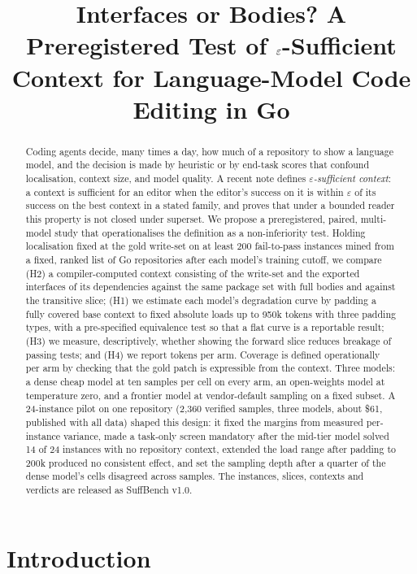 \documentclass[10pt,conference]{IEEEtran}
\title{Interfaces or Bodies? A Preregistered Test of $\eps$-Sufficient Context for Language-Model Code Editing in Go}
\author{\IEEEauthorblockN{Jude Castiel Johansen}
\IEEEauthorblockA{Shockware Limited, independent researcher\\ castiel@shockware.co.uk \quad ORCID 0009-0002-5644-3073}}
\newcommand{\eps}{\varepsilon}
\begin{document}
\maketitle

\begin{abstract}
Coding agents decide, many times a day, how much of a repository to show a language model, and the decision is made by heuristic or by end-task scores that confound localisation, context size, and model quality. A recent note defines \emph{$\eps$-sufficient context}: a context is sufficient for an editor when the editor's success on it is within $\eps$ of its success on the best context in a stated family, and proves that under a bounded reader this property is not closed under superset. We propose a preregistered, paired, multi-model study that operationalises the definition as a non-inferiority test. Holding localisation fixed at the gold write-set on at least 200 fail-to-pass instances mined from a fixed, ranked list of Go repositories after each model's training cutoff, we compare (H2) a compiler-computed context consisting of the write-set and the exported interfaces of its dependencies against the same package set with full bodies and against the transitive slice; (H1) we estimate each model's degradation curve by padding a fully covered base context to fixed absolute loads up to 950k tokens with three padding types, with a pre-specified equivalence test so that a flat curve is a reportable result; (H3) we measure, descriptively, whether showing the forward slice reduces breakage of passing tests; and (H4) we report tokens per arm. Coverage is defined operationally per arm by checking that the gold patch is expressible from the context. Three models: a dense cheap model at ten samples per cell on every arm, an open-weights model at temperature zero, and a frontier model at vendor-default sampling on a fixed subset. A 24-instance pilot on one repository (2,360 verified samples, three models, about \$61, published with all data) shaped this design: it fixed the margins from measured per-instance variance, made a task-only screen mandatory after the mid-tier model solved 14 of 24 instances with no repository context, extended the load range after padding to 200k produced no consistent effect, and set the sampling depth after a quarter of the dense model's cells disagreed across samples. The instances, slices, contexts and verdicts are released as SuffBench v1.0.
\end{abstract}

\section{Introduction}
\end{document}
